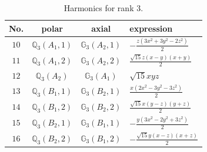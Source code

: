 \documentclass[fleqn,8pt,landscape]{jsarticle}
\begin{document}
\begin{table}[ht!]
\begin{center}
\caption{Harmonics for rank 3.}
\renewcommand{\arraystretch}{1.3}
\begin{tabular}{cccl} \hline \hline
No. & polar & axial & expression \\ \hline
$ 10 $ & $ \mathbb{Q}_{3}(A_{1},1) $ & $ \mathbb{G}_{3}(A_{2},1) $ & $ - \frac{z \left(3 x^{2} + 3 y^{2} - 2 z^{2}\right)}{2} $ \\
$ 11 $ & $ \mathbb{Q}_{3}(A_{1},2) $ & $ \mathbb{G}_{3}(A_{2},2) $ & $ \frac{\sqrt{15} z \left(x - y\right) \left(x + y\right)}{2} $ \\
$ 12 $ & $ \mathbb{Q}_{3}(A_{2}) $ & $ \mathbb{G}_{3}(A_{1}) $ & $ \sqrt{15} x y z $ \\
$ 13 $ & $ \mathbb{Q}_{3}(B_{1},1) $ & $ \mathbb{G}_{3}(B_{2},1) $ & $ \frac{x \left(2 x^{2} - 3 y^{2} - 3 z^{2}\right)}{2} $ \\
$ 14 $ & $ \mathbb{Q}_{3}(B_{1},2) $ & $ \mathbb{G}_{3}(B_{2},2) $ & $ \frac{\sqrt{15} x \left(y - z\right) \left(y + z\right)}{2} $ \\
$ 15 $ & $ \mathbb{Q}_{3}(B_{2},1) $ & $ \mathbb{G}_{3}(B_{1},1) $ & $ - \frac{y \left(3 x^{2} - 2 y^{2} + 3 z^{2}\right)}{2} $ \\
$ 16 $ & $ \mathbb{Q}_{3}(B_{2},2) $ & $ \mathbb{G}_{3}(B_{1},2) $ & $ - \frac{\sqrt{15} y \left(x - z\right) \left(x + z\right)}{2} $ \\
 \hline \hline
\end{tabular}
\end{center}
\end{table}
\end{document}
